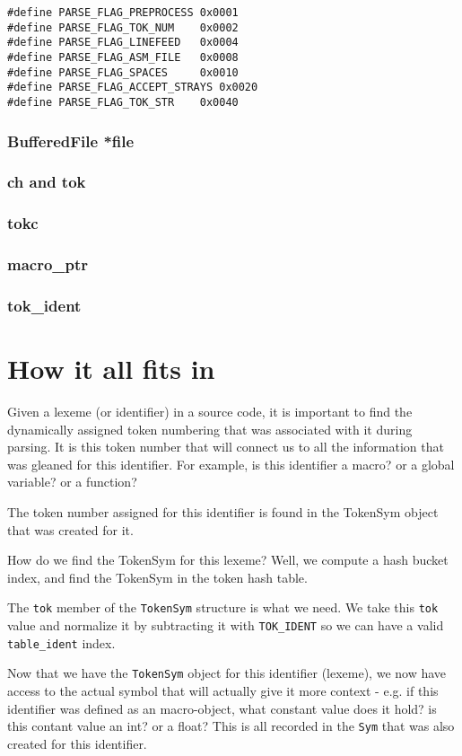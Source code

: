 \begin{verbatim}
#define PARSE_FLAG_PREPROCESS 0x0001
#define PARSE_FLAG_TOK_NUM    0x0002
#define PARSE_FLAG_LINEFEED   0x0004
#define PARSE_FLAG_ASM_FILE   0x0008
#define PARSE_FLAG_SPACES     0x0010
#define PARSE_FLAG_ACCEPT_STRAYS 0x0020
#define PARSE_FLAG_TOK_STR    0x0040
\end{verbatim}

\subsubsection{BufferedFile *file}

\subsubsection{ch and tok}

\subsubsection{tokc}

\subsubsection{macro\_ptr}

\subsubsection{tok\_ident}

\section{How it all fits in}

Given a lexeme (or identifier) in a source code, it is important to find the dynamically assigned token numbering that was associated with it during parsing. It is this token number that will connect us to all the information that was gleaned for this identifier. For example, is this identifier a macro? or a global variable? or a function? 

The token number assigned for this identifier is found in the TokenSym object that was created for it. 

How do we find the TokenSym for this lexeme? Well, we compute a hash bucket index, and find the TokenSym in the token hash table.

The \verb|tok| member of the \verb|TokenSym| structure is what we need. We take this \verb|tok| value and normalize it by subtracting it with \verb|TOK_IDENT| so we can have a valid \verb|table_ident| index.

Now that we have the \verb|TokenSym| object for this identifier (lexeme), we now have access to the actual symbol that will actually give it more context - e.g. if this identifier was defined as an macro-object, what constant value does it hold? is this contant value an int? or a float? This is all recorded in the \verb|Sym| that was also created for this identifier.
